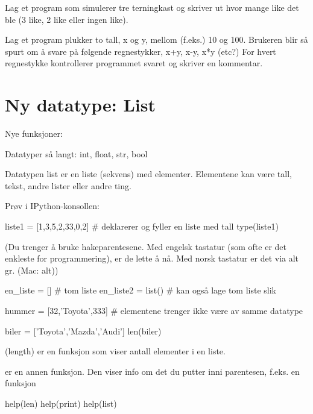 \begin{exercise}
Lag et program som simulerer tre terningkast og skriver ut hvor mange like det ble (3 like, 2 like eller ingen like).
\end{exercise}

\begin{exercise}
Lag et program plukker to tall, x og y, mellom (f.eks.) 10 og 100. Brukeren blir så spurt om å svare på følgende regnestykker, x+y, x-y, x*y (etc?) For hvert regnestykke kontrollerer programmet svaret og skriver en kommentar. 
\end{exercise}

\section{Ny datatype: List}

\begin{usnintro}
Nye funksjoner: 
\end{usnintro}

Datatyper så langt: int, float, str, bool

Datatypen list er en liste (sekvens) med elementer. Elementene kan være tall, tekst, andre lister eller andre ting.

Prøv i IPython-konsollen:

\begin{usncodebox}
liste1 = [1,3,5,2,33,0,2]  # deklarerer og fyller en liste med tall
type(liste1)
\end{usncodebox}

(Du trenger å bruke hakeparentesene. Med engelsk tastatur (som ofte er det enkleste for programmering), er de lette å nå. Med norsk tastatur er det via alt gr. (Mac: alt))

\begin{usncodebox}
en_liste = []        # tom liste
en_liste2 = list()   # kan også lage tom liste slik

hummer = [32,'Toyota',333]   # elementene trenger ikke være av samme datatype

biler = ['Toyota','Mazda','Audi'] 
len(biler) 
\end{usncodebox}

 (length) er en funksjon som viser antall elementer i en liste. 

 er en annen funksjon. Den viser info om det du putter inni parentesen, f.eks. en funksjon

\begin{usncodebox}
help(len)
help(print)
help(list)
\end{usncodebox}

